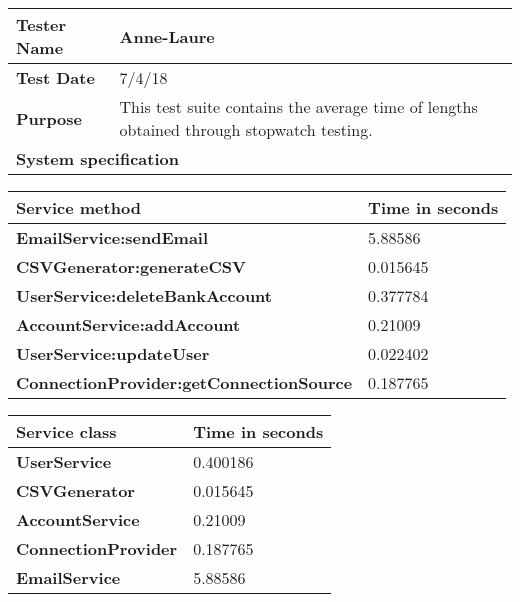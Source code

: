 \begin{longtable}{|m{4cm}|l|}
\hline
\cellcolor[HTML]{C0C0C0}\textbf{Tester Name} & \multicolumn{1}{p{13cm}|}{Anne-Laure}\\ \hline
\cellcolor[HTML]{C0C0C0}\textbf{Test Date} & \multicolumn{1}{p{13cm}|}{7/4/18}\\ \hline
\cellcolor[HTML]{C0C0C0}\textbf{Purpose} & \multicolumn{1}{p{13cm}|}{This test suite contains the average time of lengths obtained through stopwatch testing.}\\ \hline
\multicolumn{2}{|l|}{\cellcolor[HTML]{C0C0C0}\textbf{System specification}}\\ \hline
\end{longtable}

\begin{longtable}{|m{9cm}|l|}
\hline
\cellcolor[HTML]{C0C0C0}\textbf{Service method} & \multicolumn{1}{p{8cm}|}{\cellcolor[HTML]{C0C0C0}\textbf{Time in seconds}}\\ \hline
\cellcolor[HTML]{C0C0C0}\textbf{EmailService:sendEmail} & \multicolumn{1}{p{8cm}|}{5.88586}\\ \hline
\cellcolor[HTML]{C0C0C0}\textbf{CSVGenerator:generateCSV} & \multicolumn{1}{p{8cm}|}{0.015645}\\ \hline
\cellcolor[HTML]{C0C0C0}\textbf{UserService:deleteBankAccount} & \multicolumn{1}{p{8cm}|}{0.377784}\\ \hline
\cellcolor[HTML]{C0C0C0}\textbf{AccountService:addAccount} & \multicolumn{1}{p{8cm}|}{0.21009}\\ \hline
\cellcolor[HTML]{C0C0C0}\textbf{UserService:updateUser} & \multicolumn{1}{p{8cm}|}{0.022402}\\ \hline
\cellcolor[HTML]{C0C0C0}\textbf{ConnectionProvider:getConnectionSource} & \multicolumn{1}{p{8cm}|}{0.187765}\\ \hline
\end{longtable}

\begin{longtable}{|m{9cm}|l|}
\hline
\cellcolor[HTML]{C0C0C0}\textbf{Service class} & \multicolumn{1}{p{8cm}|}{\cellcolor[HTML]{C0C0C0}\textbf{Time in seconds}}\\ \hline
\cellcolor[HTML]{C0C0C0}\textbf{UserService} & \multicolumn{1}{p{8cm}|}{0.400186}\\ \hline
\cellcolor[HTML]{C0C0C0}\textbf{CSVGenerator} & \multicolumn{1}{p{8cm}|}{0.015645}\\ \hline
\cellcolor[HTML]{C0C0C0}\textbf{AccountService} & \multicolumn{1}{p{8cm}|}{0.21009}\\ \hline
\cellcolor[HTML]{C0C0C0}\textbf{ConnectionProvider} & \multicolumn{1}{p{8cm}|}{0.187765}\\ \hline
\cellcolor[HTML]{C0C0C0}\textbf{EmailService} & \multicolumn{1}{p{8cm}|}{5.88586}\\ \hline
\end{longtable}


